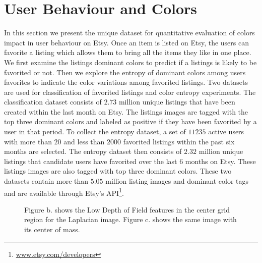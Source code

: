 \documentclass[conference,a4paper]{IEEEtran}
\begin{document}
\section{User Behaviour and Colors}
\label{sec:experiments}
In this section we present the unique dataset for quantitative evaluation of colors
impact in user behaviour on Etsy. Once an item is listed on Etsy, the
users can favorite a listing which allows them to bring all the items
they like in one place. We first examine the listings dominant colors
to predict if a listings is likely to be favorited or not. Then we
explore the entropy of dominant colors among users favorites to
indicate the color variations among favorited listings.
 Two datasets are used for
classification of favorited listings and color entropy
experiments. The classification dataset consists of $2.73$ million unique
listings that have been created within the last month on Etsy. The
listings images are tagged with the top three dominant colors and
labeled as positive if they have been favorited by a user in that period. 
To collect the entropy dataset, a set of $11235$ active users with more
than $20$ and less than $2000$ favorited listings within the past six
months are selected. The entropy dataset then consists of $2.32$ million unique listings that candidate
users have favorited over the last 6 months on Etsy. These listings
images are also tagged with top three dominant colors. These two
datasets contain more than $5.05$ million listing images and dominant
color tags and are available through Etsy's API\footnote{\url{www.etsy.com/developers}}.

\begin{figure}
  \centering
  \caption{
  Figure b. shows the Low Depth of Field features in the center grid region for the Laplacian image.  Figure c. shows the same image with its center of mass.
  }
\end{figure}
\end{document}

